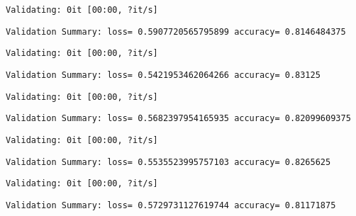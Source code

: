 \documentclass[11pt]{article}
\begin{document}
    
    \begin{Verbatim}[commandchars=\\\{\}]
Validating: 0it [00:00, ?it/s]
    \end{Verbatim}

    
    \begin{Verbatim}[commandchars=\\\{\}]
Validation Summary: loss= 0.5907720565795899 accuracy= 0.8146484375
    \end{Verbatim}

    
    \begin{Verbatim}[commandchars=\\\{\}]
Validating: 0it [00:00, ?it/s]
    \end{Verbatim}

    
    \begin{Verbatim}[commandchars=\\\{\}]
Validation Summary: loss= 0.5421953462064266 accuracy= 0.83125
    \end{Verbatim}

    
    \begin{Verbatim}[commandchars=\\\{\}]
Validating: 0it [00:00, ?it/s]
    \end{Verbatim}

    
    \begin{Verbatim}[commandchars=\\\{\}]
Validation Summary: loss= 0.5682397954165935 accuracy= 0.82099609375
    \end{Verbatim}

    
    \begin{Verbatim}[commandchars=\\\{\}]
Validating: 0it [00:00, ?it/s]
    \end{Verbatim}

    
    \begin{Verbatim}[commandchars=\\\{\}]
Validation Summary: loss= 0.5535523995757103 accuracy= 0.8265625
    \end{Verbatim}

    
    \begin{Verbatim}[commandchars=\\\{\}]
Validating: 0it [00:00, ?it/s]
    \end{Verbatim}

    
    \begin{Verbatim}[commandchars=\\\{\}]
Validation Summary: loss= 0.5729731127619744 accuracy= 0.81171875
    \end{Verbatim}
\end{document}
